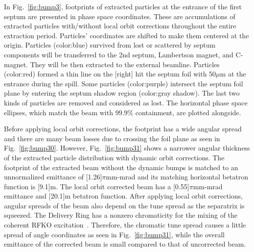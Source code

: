 \documentclass[aps,prstab,onecolumn,preprint,endfloats,11pt]{revtex4-1}
\begin{document}
In Fig.~\ref{fig:bump3}, footprints of extracted particles at the entrance of the first septum are presented in phase space coordinates.
These are accumulations of extracted particles  with/without local orbit corrections throughout the entire extraction period.
Particles' coordinates are shifted to make them centered at the origin.
Particles (color:blue) survived from lost or scattered by septum components will be transferred to the 2nd septum, Lambertson magnet, and C-magnet.
They will be then extracted to the external beamline.
Particles (color:red) formed a thin line on the [right] hit the septum foil with 50$\mu$m at the entrance during the spill.
Some particles (color:purple) intersect the septum foil plane by entering the septum shadow region (color:gray shadow).
The last two kinds of particles are removed and considered as lost.
The horizontal phase space ellipses, which match the beam with 99.9\% containment, are plotted alongside.

Before applying local orbit corrections, the footprint has a wide angular spread and there are many beam losses due to crossing the foil plane as seen in Fig.~\ref{fig:bump30}.
However, Fig.~\ref{fig:bump31} shows a narrower angular thickness of the extracted particle distribution with dynamic orbit corrections.
The footprint of the extracted beam without the dynamic bumps is matched to an unnormalized emittance of [1.26]$\pi$mm-mrad and its matching horizontal betatron function is [9.1]m. The local orbit corrected beam has a [0.55]$\pi$mm-mrad emittance and [20.1]m betatron function.
After applying local orbit corrections, angular spreads of the beam also depend on the tune spread as the separatrix is squeezed.
The Delivery Ring has a nonzero chromaticity for the mixing of the coherent RFKO excitation~\cite{ipac11}.
Therefore, the chromatic tune spread causes a little spread of angle coordinates as seen in Fig.~\ref{fig:bump31}, while the overall emittance of the corrected beam is small compared to that of uncorrected beam.
\end{document}
